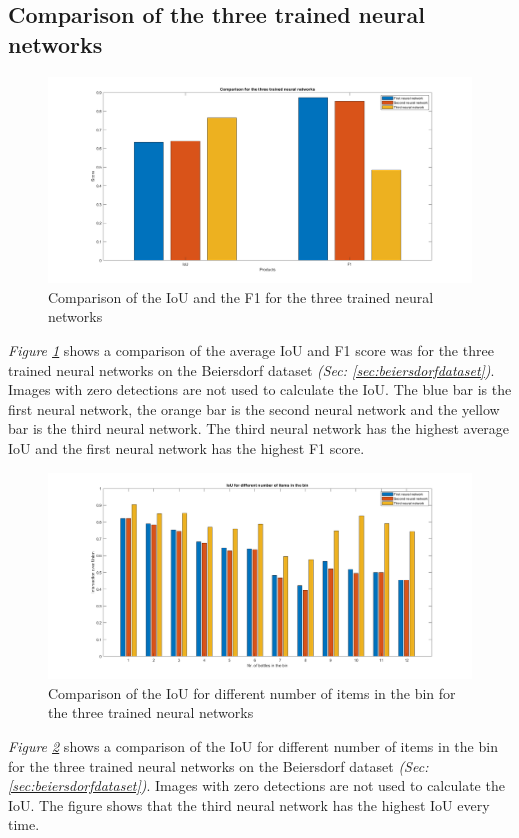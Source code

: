 \subsection{Comparison of the three trained neural networks}
\begin{figure}[h]
 \centering
 \includegraphics[width=\textwidth]{graphics/results/comparison1.png}
 \caption{Comparison of the IoU and the F1 for the three trained neural networks}
 \label{fig:comparison1}
\end{figure}

\textit{Figure \ref{fig:comparison1}} shows a comparison of the average IoU and F1 score was for the three trained neural networks on the Beiersdorf dataset \textit{(Sec: \ref{sec:beiersdorfdataset})}. Images with zero detections are not used to calculate the IoU. The blue bar is the first neural network, the orange bar is the second neural network and the yellow bar is the third neural network. The third neural network has the highest average IoU and the first neural network has the highest F1 score.

\begin{figure}[h]
 \centering
 \includegraphics[width=\textwidth]{graphics/results/comparison2.png}
 \caption{Comparison of the IoU for different number of items in the bin for the three trained neural networks}
 \label{fig:comparison2}
\end{figure}

\textit{Figure \ref{fig:comparison2}} shows a comparison of the IoU for different number of items in the bin for the three trained neural networks on the Beiersdorf dataset \textit{(Sec: \ref{sec:beiersdorfdataset})}. Images with zero detections are not used to calculate the IoU. The figure shows that the third neural network has the highest IoU every time.